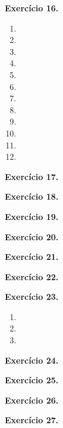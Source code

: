 \documentclass[12pt,a4paper]{article}
\begin{document}
\vspace{0.5cm}
\noindent\textbf{Exercício 16.}
\begin{enumerate}
    \renewcommand{\theenumi}{\alph{enumi}}
    \renewcommand{\labelenumi}{\theenumi)}
    \item 
    \item 
    \item 
    \item 
    \item 
    \item 
    \item 
    \item 
    \item 
    \item 
    \item 
    \item 
\end{enumerate}

\vspace{0.5cm}
\noindent\textbf{Exercício 17.}

\vspace{0.5cm}
\noindent\textbf{Exercício 18.}

\vspace{0.5cm}
\noindent\textbf{Exercício 19.}

\vspace{0.5cm}
\noindent\textbf{Exercício 20.}

\vspace{0.5cm}
\noindent\textbf{Exercício 21.}

\vspace{0.5cm}
\noindent\textbf{Exercício 22.}

\vspace{0.5cm}
\noindent\textbf{Exercício 23.}
\begin{enumerate}
    \renewcommand{\theenumi}{\alph{enumi}}
    \renewcommand{\labelenumi}{\theenumi)}
    \item 
    \item 
    \item 
\end{enumerate}

\vspace{0.5cm}
\noindent\textbf{Exercício 24.}

\vspace{0.5cm}
\noindent\textbf{Exercício 25.}

\vspace{0.5cm}
\noindent\textbf{Exercício 26.}

\vspace{0.5cm}
\noindent\textbf{Exercício 27.}
\end{document}
